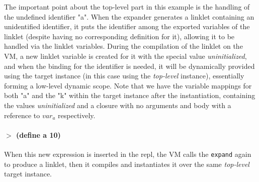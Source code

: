 The important point about the top-level part in this example is the
handling of the undefined identifier "a". When the expander generates
a linklet containing an unidentified identifier, it puts the
identifier among the exported variables of the linklet (despite having
no corresponding definition for it), allowing it to be handled via the
linklet variables. During the compilation of the linklet on the VM, a
new linklet variable is created for it with the special value
\emph{uninitialized}, and when the binding for the identifier is
needed, it will be dynamically provided using the target instance (in
this case using the \emph{top-level} instance), essentially forming a
low-level dynamic scope. Note that we have the variable mappings for
both "a" and the "k" within the target instance after the
instantiation, containing the values \emph{uninitialized} and a
closure with no arguments and body with a reference to $var_a$
respectively.

\paragraph{$>$ (define a 10)}

When this new expression is inserted in the repl, the VM calls the
\verb|expand| again to produce a linklet, then it compiles and
instantiates it over the same \emph{top-level} target instance.

\vspace{-0.5cm}

